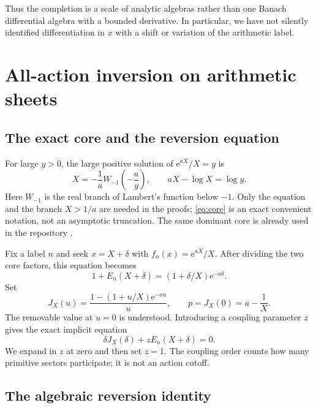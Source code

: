 \documentclass[11pt,a4paper]{article}
\numberwithin{equation}{section}
\theoremstyle{definition}
\theoremstyle{remark}
\newcommand{\ee}{\mathrm e}
\begin{document}
Thus the completion is a scale of analytic algebras rather than one
Banach differential algebra with a bounded derivative. In particular,
we have not silently identified differentiation in $x$ with a shift or
variation of the arithmetic label.

\section{All-action inversion on arithmetic sheets}\label{sec:inverse}

\subsection{The exact core and the reversion equation}

For large $y>0$, the large positive solution of $\ee^{aX}/X=y$ is
\begin{equation}
 X=-\frac1a W_{-1}\!\left(-\frac ay\right),\qquad
 aX-\log X=\log y.
 \label{eq:core}
\end{equation}
Here $W_{-1}$ is the real branch of Lambert's function below $-1$.
Only the equation and the branch $X>1/a$ are needed in the proofs;
\eqref{eq:core} is an exact convenient notation, not an asymptotic
truncation. The same dominant core is already used in the repository
\cite{repo}.

Fix a label $n$ and seek $x=X+\delta$ with $f_n(x)=\ee^{aX}/X$.
After dividing the two core factors, this equation becomes
\begin{equation}
 1+E_n(X+\delta)=(1+\delta/X)\ee^{-a\delta}.
 \label{eq:root}
\end{equation}
Set
\begin{equation}
 J_X(u)=\frac{1-(1+u/X)\ee^{-au}}u,
 \qquad p=J_X(0)=a-\frac1X.
 \label{eq:J}
\end{equation}
The removable value at $u=0$ is understood. Introducing a coupling
parameter $z$ gives the exact implicit equation
\begin{equation}
 \delta J_X(\delta)+zE_n(X+\delta)=0.
 \label{eq:coupling}
\end{equation}
We expand in $z$ at zero and then set $z=1$. The coupling order counts
how many primitive sectors participate; it is not an action cutoff.

\subsection{The algebraic reversion identity}
\end{document}
